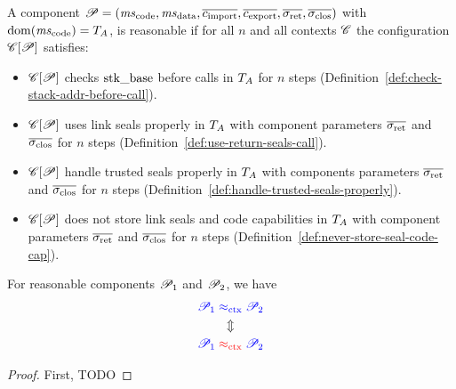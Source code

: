 \documentclass[a4paper]{article}
\begin{document}

\begin{definition}
  A component $\program = (\mscode,\msdata,\overline{c_{\mathrm{import}}},\overline{c_{\mathrm{export}}},\sigrets,\sigcloss)$ with $\dom(\mscode) = \ta$, is reasonable if for all $n$ and all contexts $\mathscr{C}$ the configuration $\mathscr{C}[\mathscr{P}]$ satisfies:
  \begin{itemize}
  \item $\mathscr{C}[\mathscr{P}]$ checks $\mathrm{stk\_base}$ before calls in $T_A$ for $n$ steps (Definition~\ref{def:check-stack-addr-before-call}).
  \item $\mathscr{C}[\mathscr{P}]$ uses link seals properly in $T_A$ with component parameters $\sigrets$ and $\sigcloss$ for $n$ steps (Definition~\ref{def:use-return-seals-call}).
  \item $\mathscr{C}[\mathscr{P}]$ handle trusted seals properly in $T_A$ with components parameters $\sigrets$ and $\sigcloss$ for $n$ steps (Definition~\ref{def:handle-trusted-seals-properly}).
  \item $\mathscr{C}[\mathscr{P}]$ does not store link seals and code capabilities in $T_A$ with component parameters $\sigrets$ and $\sigcloss$ for $n$ steps (Definition~\ref{def:never-store-seal-code-cap}).
  \end{itemize}
\end{definition}

\begin{theorem}
  \label{thm:full-abstraction}
  For reasonable components $\mathscr{P}_1$ and $\mathscr{P}_2$, we have
  \begin{gather*}
    {\color{blue}\mathscr{P}_1} \mathrel{{\color{blue} \approx_{\mathrm{ctx}}}} {\color{blue} \mathscr{P}_2}\\
    \Updownarrow\\
    {\color{blue} \mathscr{P}_1} \mathrel{{\color{red} \approx_{\mathrm{ctx}}}} {\color{blue} \mathscr{P}_2}
  \end{gather*}
\end{theorem}
\begin{proof}
  First, 
  TODO
\end{proof}
\end{document}
